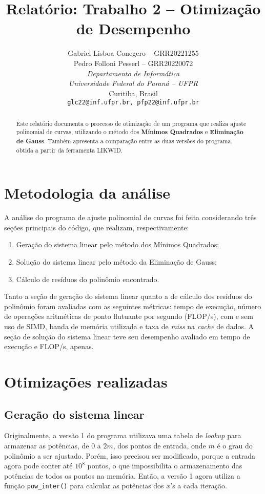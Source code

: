 \documentclass[a4paper, 11pt]{article}
\title{Relatório: Trabalho 2 -- Otimização de Desempenho}
\author{Gabriel Lisboa Conegero -- GRR20221255\\
Pedro Folloni Pesserl -- GRR20220072\\
\textit{Departamento de Informática}\\
\textit{Universidade Federal do Paraná -- UFPR}\\
Curitiba, Brasil\\
\texttt{glc22@inf.ufpr.br, pfp22@inf.ufpr.br}}
\date{}
\begin{document}
\maketitle

\begin{abstract}
\begin{singlespace}
    Este relatório documenta o processo de otimização de um programa que
    realiza ajuste polinomial de curvas, utilizando o método dos
    \textbf{Mínimos Quadrados} e \textbf{Eliminação de Gauss}. Também
    apresenta a comparação entre as duas versões do programa, obtida a
    partir da ferramenta LIKWID.
\end{singlespace}
\end{abstract}

\section{Metodologia da análise}
A análise do programa de ajuste polinomial de curvas foi feita considerando
três seções principais do código, que realizam, respectivamente:
\begin{enumerate}
    \item Geração do sistema linear pelo método dos Mínimos Quadrados;
    \item Solução do sistema linear pelo método da Eliminação de Gauss;
    \item Cálculo de resíduos do polinômio encontrado.
\end{enumerate}
Tanto a seção de geração do sistema linear quanto a de cálculo dos resíduos do
polinômio foram avaliadas com as seguintes métricas: tempo de execução, número
de operações aritméticas de ponto flutuante por segundo (FLOP/s), com e sem uso
de SIMD, banda de memória utilizada e taxa de \textit{miss} na \textit{cache}
de dados. A seção de solução do sistema linear teve seu desempenho avaliado em
tempo de execução e FLOP/s, apenas.

\section{Otimizações realizadas}
\subsection{Geração do sistema linear}
\label{subsection:gera_sl}
Originalmente, a versão 1 do programa utilizava uma tabela de \textit{lookup}
para armazenar as potências, de 0 a $2m$, dos pontos de entrada, onde $m$ é o
grau do polinômio a ser ajustado. Porém, isso precisou ser modificado, porque a
entrada agora pode conter até $10^8$ pontos, o que impossibilita o
armazenamento das potências de todos os pontos na memória. Então, a versão 1
agora utiliza a função \texttt{pow\_inter()} para calcular as potências dos
$x$'s a cada iteração.
\end{document}
